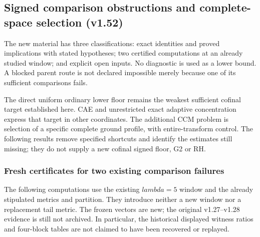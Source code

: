 \documentclass[11pt]{article}
\def\lambda{lambda}%
\theoremstyle{remark}
\begin{document}
\subsection{Signed comparison obstructions and complete-space selection (v1.52)}
\label{sec:v152-route-selection}
The new material has three classifications: exact identities and proved
implications with stated hypotheses; two certified computations at an
already studied window; and explicit open inputs. No diagnostic is used
as a lower bound. A blocked parent route is not declared impossible
merely because one of its sufficient comparisons fails.

The direct uniform ordinary lower floor remains the weakest sufficient
cofinal target established here. CAE and unrestricted exact adaptive
concentration express that target in other coordinates. The additional
CCM problem is selection of a specific complete ground profile, with
entire-transform control. The following results remove specified
shortcuts and identify the estimates still missing; they do not supply
a new cofinal signed floor, G2 or RH.



\subsubsection*{Fresh certificates for two existing comparison failures}

The following computations use the existing $\lambda=5$ window and
the already stipulated metrics and partition. They introduce neither a
new window nor a replacement tail metric. The frozen vectors are new;
the original v1.27--v1.28 evidence is still not archived. In particular,
the historical displayed witness ratios and four-block tables are not
claimed to have been recovered or replayed.
\end{document}

